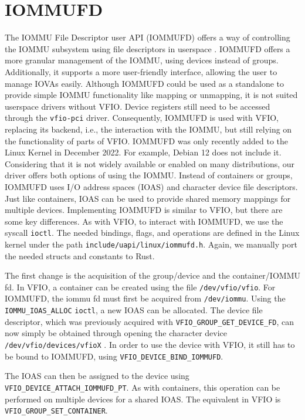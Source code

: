 \section{IOMMUFD}
The IOMMU File Descriptor user API (IOMMUFD) offers a way of controlling the IOMMU subsystem using file descriptors in userspace \cite{iommufdkerneldocs}. IOMMUFD offers a more granular management of the IOMMU, using devices instead of groups. Additionally, it supports a more user-friendly interface, allowing the user to manage IOVAs easily. Although IOMMUFD could be used as a standalone to provide simple IOMMU functionality like mapping or unmapping, it is not suited userspace drivers without VFIO. Device registers still need to be accessed through the \texttt{vfio-pci} driver. Consequently, IOMMUFD is used with VFIO, replacing its backend, i.e., the interaction with the IOMMU, but still relying on the functionality of parts of VFIO.
IOMMUFD was only recently added to the Linux Kernel in December 2022. For example, Debian 12 does not include it. Considering that it is not widely available or enabled on many distributions, our driver offers both options of using the IOMMU.
Instead of containers or groups, IOMMUFD uses I/O address spaces (IOAS) and character device file descriptors. Just like containers, IOAS can be used to provide shared memory mappings for multiple devices. Implementing IOMMUFD is similar to VFIO, but there are some key differences.
As with VFIO, to interact with IOMMUFD, we use the syscall \texttt{ioctl}. The needed bindings, flags, and operations are defined in the Linux kernel under the path \texttt{include/uapi/linux/iommufd.h}. Again, we manually port the needed structs and constants to Rust.

The first change is the acquisition of the group/device and the container/IOMMU fd.
In VFIO, a container can be created using the file \texttt{/dev/vfio/vfio}. For IOMMUFD, the iommu fd must first be acquired from \texttt{/dev/iommu}. Using the \texttt{IOMMU\_IOAS\_ALLOC} \texttt{ioctl}, a new IOAS can be allocated.
The device file descriptor, which was previously acquired with \texttt{VFIO\_GROUP\_GET\_DEVICE\_FD}, can now simply be obtained through opening the character device \texttt{/dev/vfio/devices/vfioX} \cite{vfiokerneldocs}. In order to use the device with VFIO, it still has to be bound to IOMMUFD, using \texttt{VFIO\_DEVICE\_BIND\_IOMMUFD}.

The IOAS can then be assigned to the device using \texttt{VFIO\_DEVICE\_ATTACH\_IOMMUFD\_PT}. As with containers, this operation can be performed on multiple devices for a shared IOAS. The equivalent in VFIO is \texttt{VFIO\_GROUP\_SET\_CONTAINER}.

